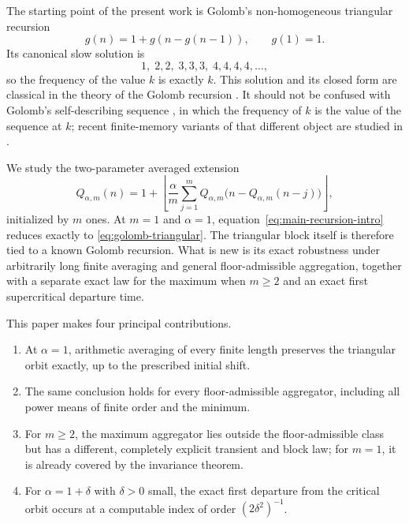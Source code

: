 \documentclass[11pt]{article}
\theoremstyle{definition}
\theoremstyle{remark}
\newcommand{\floor}[1]{\left\lfloor #1\right\rfloor}
\begin{document}
The starting point of the present work is Golomb's non-homogeneous triangular
recursion
\begin{equation}\label{eq:golomb-triangular}
g(n)=1+g(n-g(n-1)),
\qquad g(1)=1.
\end{equation}
Its canonical slow solution is
\[
1,\;2,2,\;3,3,3,\;4,4,4,4,\ldots,
\]
so the frequency of the value $k$ is exactly $k$.  This solution and its
closed form are classical in the theory of the Golomb recursion
\cite{barbeau-chew-tanny,isgur-kuznetsov-tanny,sunohara-tanny}.
It should not be confused with Golomb's self-describing sequence
\cite{vardi,petermann}, in which the frequency of $k$ is the value of the
sequence at $k$; recent finite-memory variants of that different object are studied in
\cite{cloitre-almost-golomb,cloitre-beatty}.

We study the two-parameter averaged extension
\begin{equation}\label{eq:main-recursion-intro}
Q_{\alpha,m}(n)
=
1+\floor{
\frac{\alpha}{m}\sum_{j=1}^{m}
Q_{\alpha,m}\bigl(n-Q_{\alpha,m}(n-j)\bigr)
},
\end{equation}
initialized by $m$ ones.  At $m=1$ and $\alpha=1$,
equation~\eqref{eq:main-recursion-intro} reduces exactly to
\eqref{eq:golomb-triangular}.  The triangular block itself is therefore tied
to a known Golomb recursion.  What is new is its exact robustness under
arbitrarily long finite averaging and general floor-admissible aggregation,
together with a separate exact law for the maximum when $m\ge2$ and an exact
first supercritical departure time.

This paper makes four principal contributions.
\begin{enumerate}[label=\textup{(\roman*)},leftmargin=2.2em]
\item At $\alpha=1$, arithmetic averaging of every finite length preserves
the triangular orbit exactly, up to the prescribed initial shift.
\item The same conclusion holds for every floor-admissible aggregator,
including all power means of finite order and the minimum.
\item For $m\ge2$, the maximum aggregator lies outside the floor-admissible
class but has a different, completely explicit transient and block law; for
$m=1$, it is already covered by the invariance theorem.
\item For $\alpha=1+\delta$ with $\delta>0$ small, the exact first departure
from the critical orbit occurs at a computable index of order
$(2\delta^2)^{-1}$.
\end{enumerate}
\end{document}
